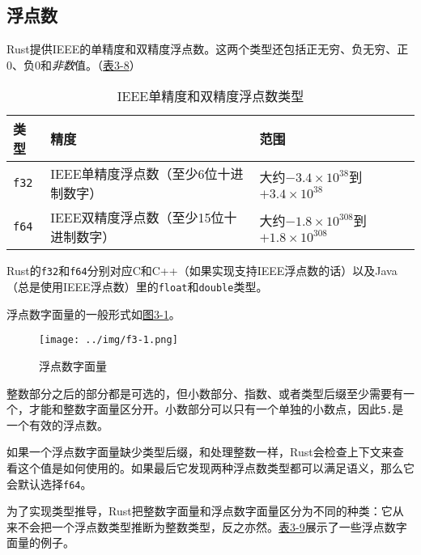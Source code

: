 \subsection{浮点数}
Rust提供IEEE的单精度和双精度浮点数。这两个类型还包括正无穷、负无穷、正0、负0和\emph{非数}值。（\hyperref[t3-8]{表3-8}）

\begin{table}[htbp]
    \centering
    \caption{IEEE单精度和双精度浮点数类型}
    \label{t3-8}
    \begin{tabular}{lll}
        \hline
        \textbf{类型}   & \textbf{精度} &   \textbf{范围}   \\
        \hline
        \texttt{f32}    & IEEE单精度浮点数（至少6位十进制数字）    & 大约$-3.4\times10^{38}$到$+3.4\times10^{38}$    \\
        \rowcolor{tablecolor}
        \texttt{f64}    & IEEE双精度浮点数（至少15位十进制数字）    & 大约$-1.8\times10^{308}$到$+1.8\times10^{308}$   \\
    \end{tabular}
\end{table}

Rust的\texttt{f32}和\texttt{f64}分别对应C和C++（如果实现支持IEEE浮点数的话）以及Java（总是使用IEEE浮点数）里的\texttt{float}和\texttt{double}类型。

浮点数字面量的一般形式如\hyperref[f3-1]{图3-1}。
\begin{figure}[htbp]
    \centering
    \texttt{[image: ../img/f3-1.png]}
    \caption{浮点数字面量}
    \label{f3-1}
\end{figure}

整数部分之后的部分都是可选的，但小数部分、指数、或者类型后缀至少需要有一个，才能和整数字面量区分开。小数部分可以只有一个单独的小数点，因此\texttt{5.}是一个有效的浮点数。

如果一个浮点数字面量缺少类型后缀，和处理整数一样，Rust会检查上下文来查看这个值是如何使用的。如果最后它发现两种浮点数类型都可以满足语义，那么它会默认选择\texttt{f64}。

为了实现类型推导，Rust把整数字面量和浮点数字面量区分为不同的种类：它从来不会把一个浮点数类型推断为整数类型，反之亦然。\hyperref[t3-9]{表3-9}展示了一些浮点数字面量的例子。

